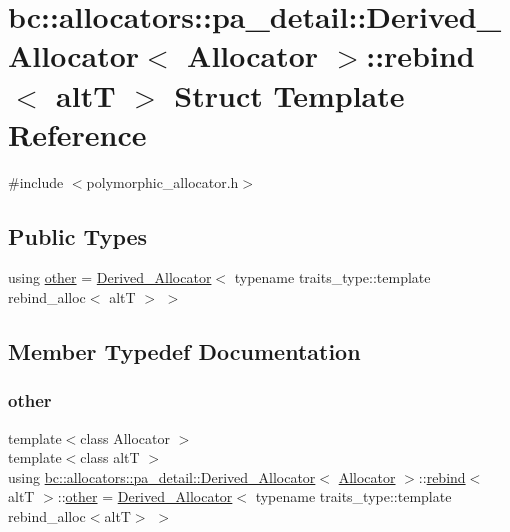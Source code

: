 \hypertarget{structbc_1_1allocators_1_1pa__detail_1_1Derived__Allocator_1_1rebind}{}\section{bc\+:\+:allocators\+:\+:pa\+\_\+detail\+:\+:Derived\+\_\+\+Allocator$<$ Allocator $>$\+:\+:rebind$<$ altT $>$ Struct Template Reference}
\label{structbc_1_1allocators_1_1pa__detail_1_1Derived__Allocator_1_1rebind}


{\ttfamily \#include $<$polymorphic\+\_\+allocator.\+h$>$}

\subsection*{Public Types}
\begin{DoxyCompactItemize}
\item 
using \hyperlink{structbc_1_1allocators_1_1pa__detail_1_1Derived__Allocator_1_1rebind_a07d0e827ae8b1b101d34c5dfccd60427}{other} = \hyperlink{structbc_1_1allocators_1_1pa__detail_1_1Derived__Allocator}{Derived\+\_\+\+Allocator}$<$ typename traits\+\_\+type\+::template rebind\+\_\+alloc$<$ altT $>$ $>$
\end{DoxyCompactItemize}


\subsection{Member Typedef Documentation}
\mbox{\label{structbc_1_1allocators_1_1pa__detail_1_1Derived__Allocator_1_1rebind_a07d0e827ae8b1b101d34c5dfccd60427}} 
\subsubsection{\texorpdfstring{other}{other}}
{\footnotesize\ttfamily template$<$class Allocator $>$ \\
template$<$class altT $>$ \\
using \hyperlink{structbc_1_1allocators_1_1pa__detail_1_1Derived__Allocator}{bc\+::allocators\+::pa\+\_\+detail\+::\+Derived\+\_\+\+Allocator}$<$ \hyperlink{classbc_1_1allocators_1_1Allocator}{Allocator} $>$\+::\hyperlink{structbc_1_1allocators_1_1pa__detail_1_1Derived__Allocator_1_1rebind}{rebind}$<$ altT $>$\+::\hyperlink{structbc_1_1allocators_1_1pa__detail_1_1Derived__Allocator_1_1rebind_a07d0e827ae8b1b101d34c5dfccd60427}{other} =  \hyperlink{structbc_1_1allocators_1_1pa__detail_1_1Derived__Allocator}{Derived\+\_\+\+Allocator}$<$ typename traits\+\_\+type\+::template rebind\+\_\+alloc$<$altT$>$ $>$}



